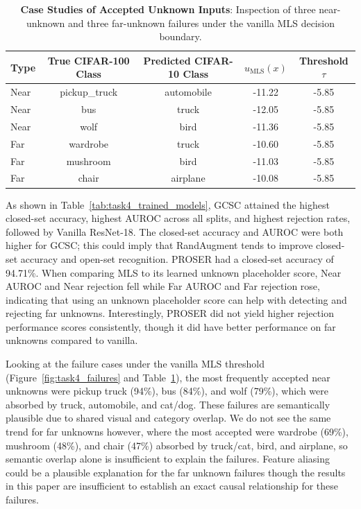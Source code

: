 \documentclass{article}
\begin{document}
\begin{table}[H]
    \centering
    \caption{\textbf{Case Studies of Accepted Unknown Inputs}: Inspection of three near-unknown and three far-unknown failures under the vanilla MLS decision boundary.}
    \label{tab:task4_failure_cases}
    \begin{tabular}{lcccc}
        \toprule
        \textbf{Type} & \textbf{True CIFAR-100 Class} & \textbf{Predicted CIFAR-10 Class} & \textbf{$u_{\text{MLS}}(x)$} & \textbf{Threshold $\tau$} \\
        \midrule
        Near & pickup\_truck & automobile & -11.22 & -5.85 \\
        Near & bus & truck & -12.05 & -5.85 \\
        Near & wolf & bird & -11.36 & -5.85 \\
        \midrule
        Far & wardrobe & truck & -10.60 & -5.85 \\
        Far & mushroom & bird & -11.03 & -5.85 \\
        Far & chair & airplane & -10.08 & -5.85 \\
        \bottomrule
    \end{tabular}
\end{table}
As shown in Table~\ref{tab:task4_trained_models}, GCSC attained the highest closed-set accuracy, highest AUROC across all splits, and highest rejection rates, followed by Vanilla ResNet-18. The closed-set accuracy and AUROC were both higher for GCSC; this could imply that RandAugment tends to improve closed-set accuracy and open-set recognition. PROSER had a closed-set accuracy of 94.71\%. When comparing MLS to its learned unknown placeholder score, Near AUROC and Near rejection fell while Far AUROC and Far rejection rose, indicating that using an unknown placeholder score can help with detecting and rejecting far unknowns. Interestingly, PROSER did not yield higher rejection performance scores consistently, though it did have better performance on far unknowns compared to vanilla.

Looking at the failure cases under the vanilla MLS threshold (Figure~\ref{fig:task4_failures} and Table~\ref{tab:task4_failure_cases}), the most frequently accepted near unknowns were pickup truck (94\%), bus (84\%), and wolf (79\%), which were absorbed by truck, automobile, and cat/dog. These failures are semantically plausible due to shared visual and category overlap. We do not see the same trend for far unknowns however, where the most accepted were wardrobe (69\%), mushroom (48\%), and chair (47\%) absorbed by truck/cat, bird, and airplane, so semantic overlap alone is insufficient to explain the failures. Feature aliasing could be a plausible explanation for the far unknown failures though the results in this paper are insufficient to establish an exact causal relationship for these failures.
\end{document}
